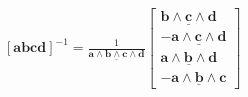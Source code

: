 \documentclass{article}
\def\lthtmlcheckvsize{\ifdim\ht\sizebox<\vsize 
  \ifdim\wd\sizebox<\hsize\expandafter\hfill\fi \expandafter\vfill
  \else\expandafter\vss\fi}%
\begin{document}
{\newpage\clearpage
{}%
$ [\textbf{a} \textbf{b} \textbf{c} \textbf{d}]^{-1} = 
\frac{1}{\underline{\textbf{a} \wedge \textbf{b} \wedge \textbf{c} \wedge \textbf{d}}} 
\begin{bmatrix}
\underline{\textbf{b} \wedge \textbf{c} \wedge \textbf{d}} \\
-\underline{\textbf{a} \wedge \textbf{c} \wedge \textbf{d}} \\
\underline{\textbf{a} \wedge \textbf{b} \wedge \textbf{d}} \\
-\underline{\textbf{a} \wedge \textbf{b} \wedge \textbf{c}}
\end{bmatrix} $%
\lthtmlindisplaymathZ
\lthtmlcheckvsize\clearpage}
\end{document}
